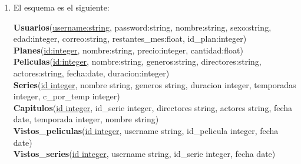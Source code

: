 \documentclass[letter]{article}
\begin{document}
	\begin{pregunta}{1} %
		\begin{enumerate}
		\item El esquema es el siguiente:
			\begin{center}
				\textbf{Usuarios}(\underline{username:string}, password:string, nombre:string, sexo:string, edad:integer, correo:string, restantes\_mes:float, id\_plan:integer)\\

				\textbf{Planes}(\underline{id:integer}, nombre:string, precio:integer, cantidad:float)\\

				\textbf{Peliculas}(\underline{id:integer}, nombre:string, generos:string, directores:string, actores:string, fecha:date, duracion:integer) \\

				\textbf{Series}(\underline{id integer}, nombre string, generos string, duracion integer, temporadas integer, c\_por\_temp integer) \\

				\textbf{Capitulos}(\underline{id integer}, id\_serie integer, directores string, actores string, fecha date, temporada integer, nombre string) \\

				\textbf{Vistos\_peliculas}(\underline{id integer}, username string, id\_pelicula integer, fecha date) \\

				\textbf{Vistos\_series}(\underline{id integer}, username string, id\_serie integer, fecha date) \\


\end{center}
\end{enumerate}
\end{pregunta}
\end{document}
